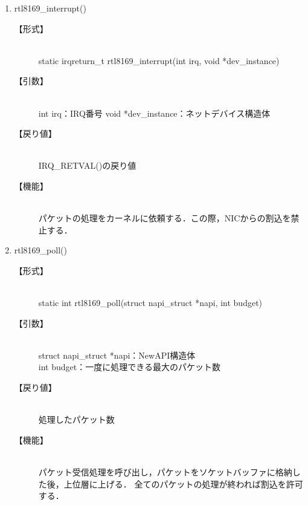\documentclass[12pt]{jsarticle}
\begin{document}
\begin{enumerate}
    \item rtl8169\_interrupt()
        \begin{description}
            \item[【形式】]\mbox{}\\
                static irqreturn\_t rtl8169\_interrupt(int irq, void *dev\_instance)
            \item[【引数】]\mbox{}\\
                int irq：IRQ番号
                void *dev\_instance：ネットデバイス構造体
            \item[【戻り値】]\mbox{}\\
                IRQ\_RETVAL()の戻り値
            \item[【機能】]\mbox{}\\
                パケットの処理をカーネルに依頼する．この際，NICからの割込を禁止する．
        \end{description}

    \item rtl8169\_poll()
        \begin{description}
            \item[【形式】]\mbox{}\\
                static int rtl8169\_poll(struct napi\_struct *napi, int budget)
            \item[【引数】]\mbox{}\\
                struct napi\_struct *napi：NewAPI構造体\\
                int budget：一度に処理できる最大のパケット数
            \item[【戻り値】]\mbox{}\\
                処理したパケット数
            \item[【機能】]\mbox{}\\
                パケット受信処理を呼び出し，パケットをソケットバッファに格納した後，上位層に上げる．
                全てのパケットの処理が終われば割込を許可する．
        \end{description}
\end{enumerate}
\end{document}
